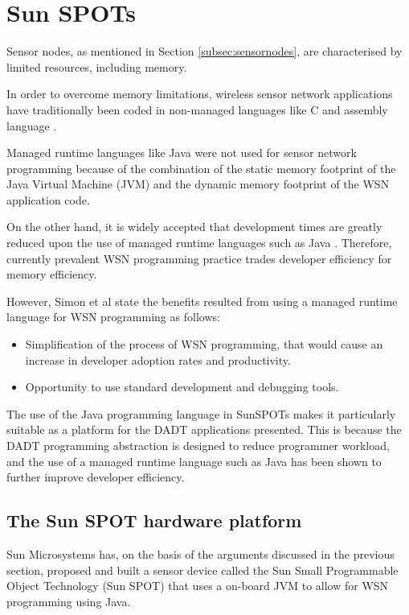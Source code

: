 \section {Sun SPOTs} \label{sec:sunspots}

Sensor nodes, as mentioned in Section \ref{subsec:sensornodes}, are
characterised by limited resources, including memory. 

In order to overcome memory limitations, wireless sensor network applications
have traditionally been coded in non-managed languages like C and assembly
language \cite{simon_squawk:2006}.
 
Managed runtime languages like Java were not used for sensor network programming
because of the combination of the static memory footprint of the Java Virtual
Machine (JVM) and the dynamic memory footprint of the WSN application code.
 
On the other hand, it is widely accepted that development times are greatly reduced
upon the use of managed runtime languages such as Java
\cite{simon_squawk:2006}. Therefore, currently prevalent WSN programming practice
trades developer efficiency for memory efficiency. 

However, Simon et al \cite{simon_squawk:2006} state the benefits resulted from
using a managed runtime language for WSN programming as follows:

\begin{itemize}
  \item Simplification of the process of WSN programming, that would cause an
  increase in developer adoption rates and productivity.
  \item Opportunity to use standard development and debugging tools.
\end{itemize}

The use of the Java programming language in SunSPOTs makes it particularly
suitable as a platform for the DADT applications presented. This is because the
DADT programming abstraction is designed to reduce programmer workload, and the
use of a managed runtime language such as Java has been shown to further
improve developer efficiency.
 
\subsection{The Sun SPOT hardware platform }
Sun Microsystems has, on the basis of the arguments discussed in the previous
section, proposed and built a sensor device
called the Sun Small Programmable Object Technology (Sun SPOT) that uses a
on-board JVM to allow for WSN programming using Java.

